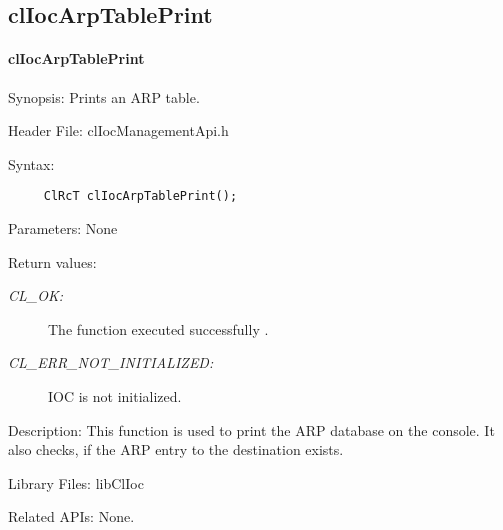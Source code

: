 \begin{flushleft}
\subsection{clIocArpTablePrint}
\hypertarget{pageIOC211}{}\paragraph{cl\-Ioc\-Arp\-Table\-Print}\label{pageIOC211}
\begin{Desc}
\item[Synopsis:]Prints an ARP table.\end{Desc}
\begin{Desc}
\item[Header File:]clIocManagementApi.h\end{Desc}
\begin{Desc}
\item[Syntax:]

\footnotesize\begin{verbatim}     ClRcT clIocArpTablePrint();
\end{verbatim}
\normalsize
\end{Desc}
\begin{Desc}
\item[Parameters:]None\end{Desc}
\begin{Desc}
\item[Return values:]
\begin{description}
\item[{\em CL\_\-OK:}]The function executed successfully . \item[{\em CL\_\-ERR\_\-NOT\_\-INITIALIZED:}]IOC is not initialized.\end{description}
\end{Desc}
\begin{Desc}
\item[Description:]This function is used to print the ARP database on the console. It also checks, if the ARP entry to the destination 
exists.\end{Desc}
\begin{Desc}
\item[Library Files:]libClIoc\end{Desc}
\begin{Desc}
\item[Related APIs:]None.\end{Desc}
\newpage




\end{flushleft}
